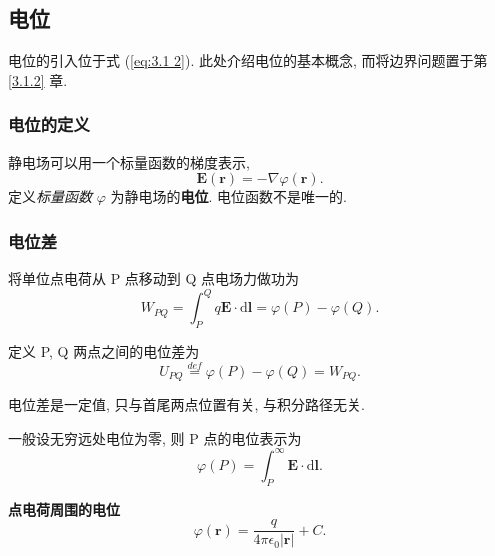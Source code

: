 \subsection{电位}
电位的引入位于式 (\ref{eq:3.1 2}). 此处介绍电位的基本概念, 而将边界问题置于第 \ref{3.1.2} 章.

\subsubsection{电位的定义}
静电场可以用一个标量函数的梯度表示,
\begin{equation}
    \bm{E}(\bm{r})=-\nabla\varphi(\bm{r}).
\end{equation}
定义\textit{标量函数} $\varphi$ 为静电场的\textbf{电位}. 电位函数不是唯一的.

\subsubsection{电位差}
将单位点电荷从 P 点移动到 Q 点电场力做功为
\begin{equation}
    W_{PQ}=\int_{P}^{Q}q\bm{E}\cdot\mathrm{d}\bm{l}=\varphi(P)-\varphi(Q).
\end{equation}

定义 P, Q 两点之间的电位差为
\begin{equation}
    U_{PQ}\stackrel{def}{=}\varphi(P)-\varphi(Q)=W_{PQ}.
\end{equation}

电位差是一定值, 只与首尾两点位置有关, 与积分路径无关.

一般设无穷远处电位为零, 则 P 点的电位表示为
\begin{equation}
    \varphi(P)=\int_{P}^{\infty}\bm{E}\cdot\mathrm{d}\bm{l}.
\end{equation}

\textbf{点电荷周围的电位}
\begin{equation}
    \varphi(\bm{r})=\frac{q}{4\pi\epsilon_0|\bm{r}|}+C.
\end{equation}
